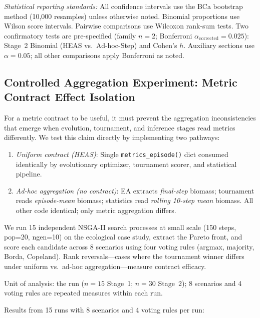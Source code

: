 \documentclass{wscpaperproc}
\begin{document}
\emph{Statistical reporting standards:} All confidence intervals use the BCa
bootstrap method (10,000 resamples) unless otherwise noted. Binomial proportions
use Wilson score intervals. Pairwise comparisons use Wilcoxon rank-sum tests.
Two confirmatory tests are pre-specified (family $n\!=\!2$; Bonferroni
$\alpha_{\text{corrected}}\!=\!0.025$): Stage~2 Binomial (HEAS vs.\ Ad-hoc-Step) and
Cohen's $h$. Auxiliary sections use $\alpha\!=\!0.05$; all other comparisons apply
Bonferroni as noted.

\subsection{Controlled Aggregation Experiment: Metric Contract Effect Isolation}
\label{sec:controlled-agg}

For a metric contract to be useful, it must prevent the aggregation inconsistencies
that emerge when evolution, tournament, and inference stages read metrics differently.
We test this claim directly by implementing two pathways:

\begin{enumerate}
\item \emph{Uniform contract (HEAS)}: Single \texttt{metrics\_episode()} dict consumed
identically by evolutionary optimizer, tournament scorer, and statistical pipeline.
\item \emph{Ad-hoc aggregation (no contract)}: EA extracts \emph{final-step} biomass;
tournament reads \emph{episode-mean} biomass; statistics read \emph{rolling 10-step mean}
biomass. All other code identical; only metric aggregation differs.
\end{enumerate}

We run 15 independent NSGA-II search processes at small scale (150 steps, pop=20,
ngen=10) on the ecological case study, extract the Pareto front, and score each
candidate across 8 scenarios using four voting rules (argmax, majority, Borda,
Copeland). Rank reversals---cases where the tournament winner differs under uniform
vs.\ ad-hoc aggregation---measure contract efficacy.

Unit of analysis: the run ($n\!=\!15$ Stage~1; $n\!=\!30$ Stage~2); 8 scenarios and 4 voting rules are repeated measures within each run.

Results from 15 runs with 8 scenarios and 4 voting rules per run:
\end{document}
